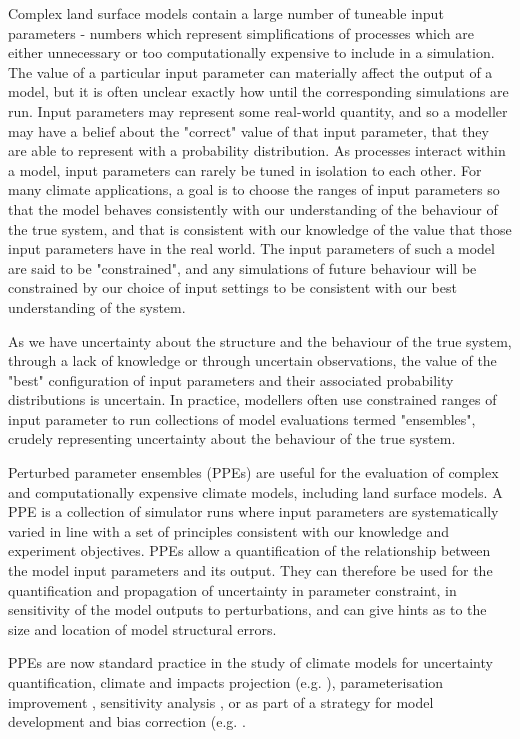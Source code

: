 \documentclass[gmd, manuscript]{copernicus}
\begin{document}
Complex land surface models contain a large number of tuneable input parameters - numbers which represent simplifications of processes which are either unnecessary or too computationally expensive to include in a simulation. The value of a particular input parameter can materially affect the output of a model, but it is often unclear exactly how until the corresponding simulations are run. Input parameters may represent some real-world quantity, and so a modeller may have a belief about the "correct" value of that input parameter, that they are able to represent with a probability distribution. As processes interact within a model, input parameters can rarely be tuned in isolation to each other. For many climate applications, a goal is to choose the ranges of input parameters so that the model behaves consistently with our understanding of the behaviour of the true system, and that is consistent with our knowledge of the value that those input parameters have in the real world. The input parameters of such a model are said to be "constrained", and any simulations of future behaviour will be constrained by our choice of input settings to be consistent with our best understanding of the system.

As we have uncertainty about the structure and the behaviour of the true system, through a lack of knowledge or through uncertain observations, the value of the "best" configuration of input parameters and their associated probability distributions is uncertain. In practice, modellers often use constrained ranges of input parameter to run collections of model evaluations termed "ensembles", crudely representing uncertainty about the behaviour of the true system.

Perturbed parameter ensembles (PPEs) are useful for the evaluation of complex and computationally expensive climate models, including land surface models. A PPE is a collection of simulator runs where input parameters are systematically varied in line with a set of principles consistent with our knowledge and experiment objectives. PPEs allow a quantification of the relationship between the model input parameters and its output. They can therefore be used for the quantification and propagation of uncertainty in parameter constraint, in sensitivity of the model outputs to perturbations, and can give hints as to the size and location of model structural errors.

PPEs are now standard practice in the study of climate models for uncertainty quantification, climate and impacts projection (e.g. \cite{sexton2021perturbed, edwards2019revisiting}), parameterisation improvement \citep{couvreux2021process}, sensitivity analysis \citep{carslaw2013large}, or as part of a strategy for model development and bias correction (e.g. \cite{williamson2015identifying,mcneall2016impact, mcneall2020correcting, hourdin2017art}.
\end{document}

